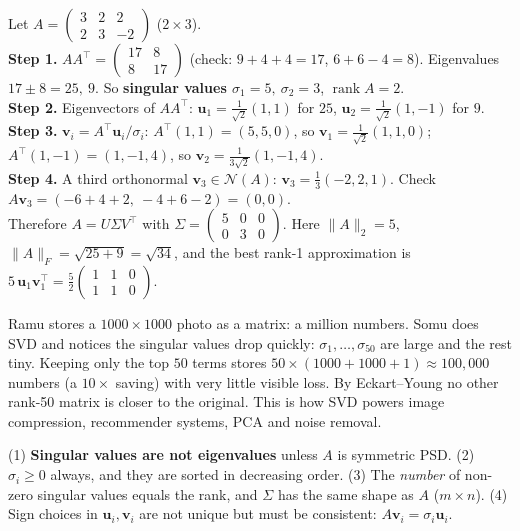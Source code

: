 \documentclass[11pt,a4paper]{article}
\newcommand{\T}{^{\top}}
\newcommand{\rank}{\operatorname{rank}}
\newcommand{\Null}{\mathcal{N}}
\begin{document}
\begin{example}
Let $A=\begin{pmatrix}3&2&2\\2&3&-2\end{pmatrix}$ ($2\times3$).\\
\textbf{Step 1.} $AA\T=\begin{pmatrix}17&8\\8&17\end{pmatrix}$ (check: $9+4+4=17$, $6+6-4=8$). Eigenvalues $17\pm8=25,\ 9$. So \textbf{singular values $\sigma_1=5,\ \sigma_2=3$}, $\rank A=2$.\\
\textbf{Step 2.} Eigenvectors of $AA\T$: $\mathbf u_1=\tfrac1{\sqrt2}(1,1)$ for $25$, $\mathbf u_2=\tfrac1{\sqrt2}(1,-1)$ for $9$.\\
\textbf{Step 3.} $\mathbf v_i=A\T\mathbf u_i/\sigma_i$: $A\T(1,1)=(5,5,0)$, so $\mathbf v_1=\tfrac{1}{\sqrt2}(1,1,0)$; $A\T(1,-1)=(1,-1,4)$, so $\mathbf v_2=\tfrac{1}{3\sqrt2}(1,-1,4)$.\\
\textbf{Step 4.} A third orthonormal $\mathbf v_3\in\Null(A)$: $\mathbf v_3=\tfrac13(-2,2,1)$. Check $A\mathbf v_3=(-6+4+2,\ -4+6-2)=(0,0)$. \checkmark\\
Therefore $A=U\Sigma V\T$ with $\Sigma=\begin{pmatrix}5&0&0\\0&3&0\end{pmatrix}$. Here $\|A\|_2=5$, $\|A\|_F=\sqrt{25+9}=\sqrt{34}$, and the best rank-1 approximation is $5\,\mathbf u_1\mathbf v_1\T=\tfrac52\begin{pmatrix}1&1&0\\1&1&0\end{pmatrix}$.
\end{example}

\begin{story}
Ramu stores a $1000\times1000$ photo as a matrix: a million numbers. Somu does SVD and notices the singular values drop quickly: $\sigma_1,\dots,\sigma_{50}$ are large and the rest tiny. Keeping only the top $50$ terms stores $50\times(1000+1000+1)\approx100{,}000$ numbers (a $10\times$ saving) with very little visible loss. By Eckart--Young no other rank-50 matrix is closer to the original. This is how SVD powers image compression, recommender systems, PCA and noise removal.
\end{story}

\begin{trap}
(1) \textbf{Singular values are not eigenvalues} unless $A$ is symmetric PSD. (2) $\sigma_i\ge0$ always, and they are sorted in decreasing order. (3) The \emph{number} of non-zero singular values equals the rank, and $\Sigma$ has the same shape as $A$ ($m\times n$). (4) Sign choices in $\mathbf u_i,\mathbf v_i$ are not unique but must be consistent: $A\mathbf v_i=\sigma_i\mathbf u_i$.
\end{trap}
\end{document}
